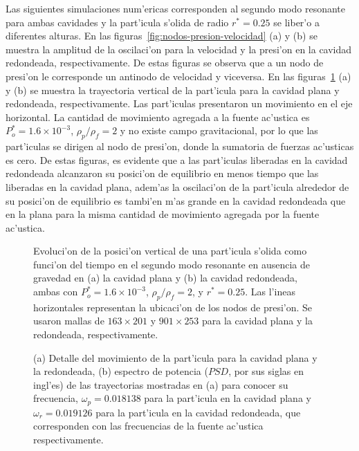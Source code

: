 Las siguientes simulaciones num'ericas corresponden al segundo modo resonante para ambas cavidades
y la part'icula s'olida de radio $r^\ast =0.25$ se liber'o a diferentes alturas.  
En las figuras~\ref{fig:nodos-presion-velocidad} (a) y (b) se muestra la amplitud de la oscilaci'on para la velocidad
y la presi'on en la cavidad redondeada, respectivamente. De estas figuras se  observa que a un nodo
de presi'on le corresponde un antinodo de velocidad y viceversa. 
En las figuras~\ref{fig:y-g-0} (a) y (b) se muestra la trayectoria
vertical de la part'icula para la cavidad plana y redondeada, respectivamente. Las part'iculas
presentaron un movimiento en el eje horizontal. La cantidad de movimiento
agregada a la fuente ac'ustica es  $P_o^\ast=1.6 \times 10^{-3}$, $\rho_p/\rho_f =2$ 
y no existe campo gravitacional, por lo que las part'iculas se dirigen al nodo de presi'on, 
donde la sumatoria de fuerzas ac'usticas es cero. De estas figuras, es evidente que a las part'iculas liberadas
en la cavidad redondeada alcanzaron su posici'on de equilibrio en menos tiempo que las liberadas
en la cavidad plana, adem'as  la oscilaci'on de la part'icula alrededor de su posici'on
de equilibrio es tambi'en m'as grande en la cavidad redondeada que en la plana para la misma cantidad de 
movimiento agregada por la fuente ac'ustica.
\begin{figure}


\vskip 5mm
\caption{\label{fig:y-g-0}
Evoluci'on de la posici'on vertical de una part'icula s'olida como funci'on del tiempo
en el segundo modo resonante en ausencia de gravedad en (a) la cavidad  plana y (b) la
cavidad  redondeada, ambas con  $P_o^\ast = 1.6\times 10^{-3}$, $\rho_p/\rho_f=2$, y $r^\ast=0.25$.
Las l'ineas horizontales representan la ubicaci'on de los nodos de presi'on. 
Se usaron mallas de  $163\times 201$ y $901\times 253$ para la cavidad plana y la redondeada, respectivamente.
}
\end{figure}
\begin{figure}


\caption{\label{fig:detalle-flat-rounded}
(a) Detalle del movimiento de la part'icula para la cavidad
plana y la redondeada, (b) espectro de potencia ($PSD$, por sus siglas en ingl'es) de 
las trayectorias mostradas en (a) para conocer su frecuencia, $\omega_p=0.018138$ para
la part'icula en la cavidad plana y $\omega_r=0.019126$ para la part'icula en la cavidad
redondeada, que corresponden con las frecuencias de la fuente ac'ustica respectivamente.
}
\end{figure}
